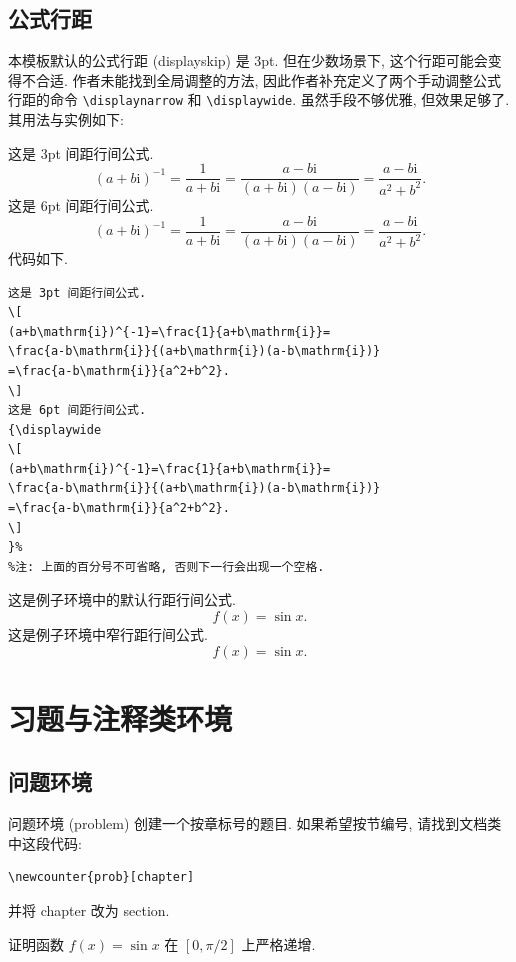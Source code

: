 \documentclass[../book.tex]{subfiles}
\begin{document}
    \subsection{公式行距}

本模板默认的公式行距 (displayskip) 是 3pt. 但在少数场景下, 这个行距可能会变得不合适. 作者未能找到全局调整的方法, 因此作者补充定义了两个手动调整公式行距的命令 \texttt{\textbackslash displaynarrow} 和 \texttt{\textbackslash displaywide}. 虽然手段不够优雅, 但效果足够了. 其用法与实例如下:

这是 3pt 间距行间公式. 
\[
(a+b\mathrm{i})^{-1}=\frac{1}{a+b\mathrm{i}}=\frac{a-b\mathrm{i}}{(a+b\mathrm{i})(a-b\mathrm{i})}=\frac{a-b\mathrm{i}}{a^2+b^2}.
\]
这是 6pt 间距行间公式. 
{\displaywide
\[
(a+b\mathrm{i})^{-1}=\frac{1}{a+b\mathrm{i}}=\frac{a-b\mathrm{i}}{(a+b\mathrm{i})(a-b\mathrm{i})}=\frac{a-b\mathrm{i}}{a^2+b^2}.
\]
}%
代码如下. 
\begin{lstlisting}
这是 3pt 间距行间公式. 
\[
(a+b\mathrm{i})^{-1}=\frac{1}{a+b\mathrm{i}}=
\frac{a-b\mathrm{i}}{(a+b\mathrm{i})(a-b\mathrm{i})}
=\frac{a-b\mathrm{i}}{a^2+b^2}.
\]
这是 6pt 间距行间公式. 
{\displaywide
\[
(a+b\mathrm{i})^{-1}=\frac{1}{a+b\mathrm{i}}=
\frac{a-b\mathrm{i}}{(a+b\mathrm{i})(a-b\mathrm{i})}
=\frac{a-b\mathrm{i}}{a^2+b^2}.
\]
}%
%注: 上面的百分号不可省略, 否则下一行会出现一个空格. 
\end{lstlisting}

\begin{example}
    这是例子环境中的默认行距行间公式. 
    \[
    f(x) = \sin x.
    \]
    这是例子环境中窄行距行间公式. 
    {\displaynarrow
    \[
    f(x)= \sin x.
    \]
    }%
\end{example}

\section{习题与注释类环境}

    \subsection{问题环境}

问题环境 (problem) 创建一个按章标号的题目. 如果希望按节编号, 请找到文档类中这段代码:
\begin{lstlisting}
\newcounter{prob}[chapter]
\end{lstlisting}
并将 chapter 改为 section. 

\begin{problem}
    证明函数 \( f(x) = \sin x \) 在 \( [0, \pi/2] \) 上严格递增.   
\end{problem}
\end{document}
